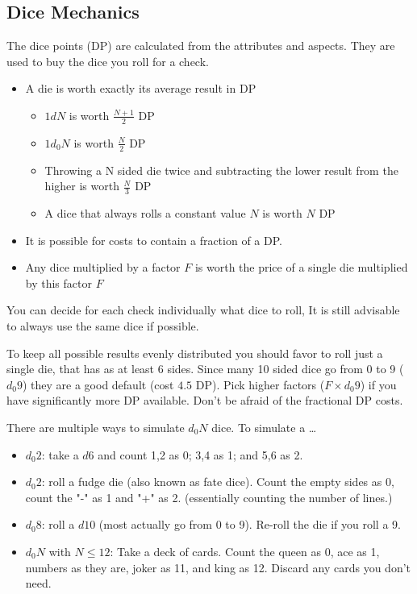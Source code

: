 \documentclass[11pt]{article}
\begin{document}
{\subsection{Dice Mechanics}
\label{sec:orge9ea528}
\begin{short}
The dice points (DP) are calculated from the attributes and aspects. They are used to buy the dice you roll for a check.

\begin{itemize}
\item A die is worth exactly its average result in DP
\begin{itemize}
\item \(1 d N\) is worth \(\frac{N+1}{2}\) DP
\item \(1 d_0 N\) is worth \(\frac{N}{2}\) DP
\item Throwing a N sided die twice and subtracting the lower result from the higher is worth \(\frac{N}{3}\) DP
\item A dice that always rolls a constant value \(N\) is worth \(N\) DP
\end{itemize}
\item It is possible for costs to contain a fraction of a DP.
\item Any dice multiplied by a factor \(F\) is worth the price of a single die multiplied by this factor \(F\)
\end{itemize}

You can decide for each check individually what dice to roll, It is still advisable to always use the same dice if possible.
\end{short}

To keep all possible results evenly distributed you should favor to roll just a single die, that has as at least 6 sides. Since many 10 sided dice go from 0 to 9 (\(d_0 9\)) they are a good default (cost \(4.5\) DP). Pick higher factors (\(F \times d_0 9\)) if you have significantly more DP available. Don't be afraid of the fractional DP costs. 

There are multiple ways to simulate \(d_0 N\) dice. To simulate a \ldots{}
\begin{itemize}
\item \(d_0 2\): take a \(d6\) and count 1,2 as 0; 3,4 as 1; and 5,6 as 2.
\item \(d_0 2\): roll a fudge die (also known as fate dice). Count the empty sides as 0, count the "-" as 1 and "+" as 2. (essentially counting the number of lines.)
\item \(d_0 8\): roll a \(d10\) (most actually go from 0 to 9). Re-roll the die if you roll a 9.
\item \(d_0 N\) with \(N \le 12\): Take a deck of cards. Count the queen as 0, ace as 1, numbers as they are, joker as 11, and king as 12. Discard any cards you don't need.
\end{itemize}

}
\end{document}
